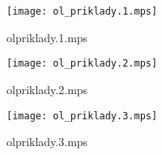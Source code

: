 \documentclass[letterpaper,10pt]{article}
\begin{document}
\begin{figure}
    \centering
    \texttt{[image: ol\_priklady.1.mps]}
    \caption{olpriklady.1.mps}
\end{figure}

\begin{figure}
    \centering
    \texttt{[image: ol\_priklady.2.mps]}
    \caption{olpriklady.2.mps}
\end{figure}

\begin{figure}
    \centering
    \texttt{[image: ol\_priklady.3.mps]}
    \caption{olpriklady.3.mps}
\end{figure}
\end{document}
